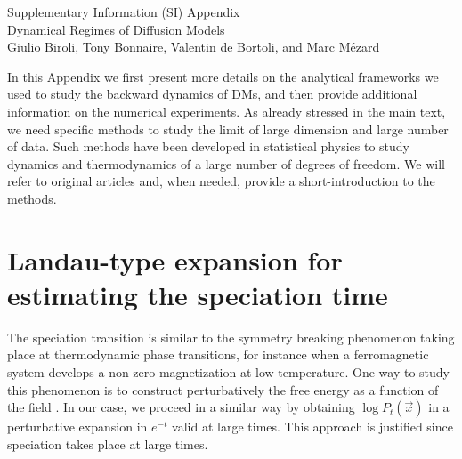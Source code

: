 \documentclass[10pt,twocolumn]{article}
\begin{document}


\newpage
\appendix
\onecolumn
\begin{center}
    {\LARGE Supplementary Information (SI) Appendix} \\ \vspace{1ex} {\Large Dynamical Regimes of Diffusion Models}
    \\ \vspace{3ex} {\large Giulio Biroli, Tony Bonnaire, Valentin de Bortoli, and Marc M\'ezard}
\end{center}

In this Appendix we first present more details on the analytical frameworks we used to study the backward dynamics of DMs, and then provide additional information on the numerical experiments. As already stressed in the main text, we need specific methods to study the limit of large dimension and large number of data. Such methods have been developed in statistical physics to study dynamics and thermodynamics of a large number of degrees of freedom. We will refer to original articles and, when needed, provide a short-introduction to the methods.

\section{Landau-type expansion for estimating the speciation time}
The speciation transition is similar to the symmetry breaking phenomenon \cite{ambrogioni,GBM} taking place at thermodynamic phase transitions, for instance when a ferromagnetic system develops a non-zero magnetization at low temperature. One way to study this phenomenon is to construct perturbatively the free energy as a function of the field \cite{chaikin1995principles}. In our case, we proceed in a similar way 
by obtaining $\log P_t(\vec x)$ in a perturbative expansion in $e^{-t}$ valid at large times. This approach is justified since speciation takes place at large times. 
\end{document}
